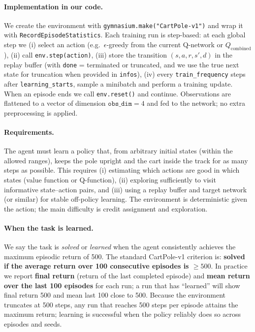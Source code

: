 \documentclass[11pt]{article}
\begin{document}
\paragraph{Implementation in our code.} We create the environment with \texttt{gymnasium.make("CartPole-v1")} and wrap it with \texttt{RecordEpisodeStatistics}. Each training run is step-based: at each global step we (i) select an action (e.g.\ $\epsilon$-greedy from the current Q-network or $Q_{\text{combined}}$), (ii) call \texttt{env.step(action)}, (iii) store the transition $(s, a, r, s', d)$ in the replay buffer (with \texttt{done} = terminated or truncated, and we use the true next state for truncation when provided in \texttt{infos}), (iv) every \texttt{train\_frequency} steps after \texttt{learning\_starts}, sample a minibatch and perform a training update. When an episode ends we call \texttt{env.reset()} and continue. Observations are flattened to a vector of dimension $\texttt{obs\_dim} = 4$ and fed to the network; no extra preprocessing is applied.

\paragraph{Requirements.} The agent must learn a policy that, from arbitrary initial states (within the allowed ranges), keeps the pole upright and the cart inside the track for as many steps as possible. This requires (i) estimating which actions are good in which states (value function or Q-function), (ii) exploring sufficiently to visit informative state--action pairs, and (iii) using a replay buffer and target network (or similar) for stable off-policy learning. The environment is deterministic given the action; the main difficulty is credit assignment and exploration.

\paragraph{When the task is learned.} We say the task is \emph{solved} or \emph{learned} when the agent consistently achieves the maximum episodic return of 500. The standard CartPole-v1 criterion is: \textbf{solved if the average return over 100 consecutive episodes is $\ge 500$}. In practice we report \textbf{final return} (return of the last completed episode) and \textbf{mean return over the last 100 episodes} for each run; a run that has ``learned'' will show final return 500 and mean last 100 close to 500. Because the environment truncates at 500 steps, any run that reaches 500 steps per episode attains the maximum return; learning is successful when the policy reliably does so across episodes and seeds.
\end{document}
